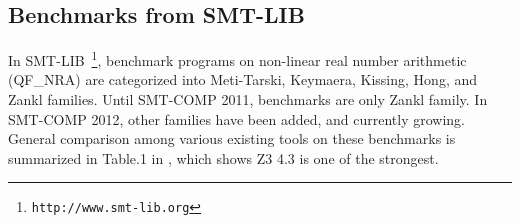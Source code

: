\documentclass[runningheads,a4paper,oribibl]{llncs}
\newcommand{\suppress}[1]{} %
\begin{document}
\suppress{
In the experiments from simple benchmarks for three measures above, \textbf{raSAT} outperforms \textbf{Z3 4.3} and we have some observations, which are,
\begin{itemize}
\item \textbf{Z3 4.3} meets difficulties for high degree problems, i.e., problems of 2 variables with degrees 20, 22, and problems of 4, 5 variables with degrees 4, 6, 8 in these experiments,

\item \textbf{raSAT} works quite well for high degrees and increasing number of APIs. It reports results \emph{very fast} in comparison with \textbf{Z3 4.3}.

\item However \textbf{raSAT} suffers from enlarging dimensions for both SAT and UNSAT problems. We need further comparison, investigation, and reasonable strategies for increasing dimensions because explosion of boxes occurs when intervals are decomposed in \textbf{raSAT}.
\end{itemize}
}

\subsection{Benchmarks from SMT-LIB} \label{sec:expsmtlib}

In SMT-LIB~\footnote{\tt http://www.smt-lib.org}, 
benchmark programs on non-linear real number arithmetic 
(QF\_NRA) are categorized into Meti-Tarski, Keymaera, Kissing, Hong, and Zankl families. 
Until SMT-COMP 2011, benchmarks are only Zankl family. 
In SMT-COMP 2012, other families have been added, and currently growing. 
General comparison among various existing tools on these benchmarks is summarized in 
Table.1 in \cite{Jovanovic13}, which shows Z3 4.3 is one of the strongest. 

\begin{table}[t]
\centering
{}
\medskip
\caption{Experimental results for Hong, Zankl, and Meti-Tarski families}
\label{tab:expsmtlib}
\end{table}
\end{document}
